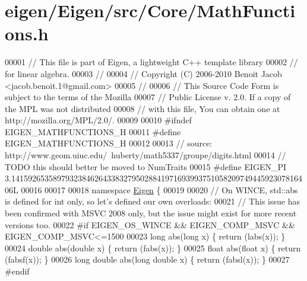 \hypertarget{eigen_2_eigen_2src_2_core_2_math_functions_8h_source}{}\section{eigen/\+Eigen/src/\+Core/\+Math\+Functions.h}
\label{eigen_2_eigen_2src_2_core_2_math_functions_8h_source}

\begin{DoxyCode}
00001 \textcolor{comment}{// This file is part of Eigen, a lightweight C++ template library}
00002 \textcolor{comment}{// for linear algebra.}
00003 \textcolor{comment}{//}
00004 \textcolor{comment}{// Copyright (C) 2006-2010 Benoit Jacob <jacob.benoit.1@gmail.com>}
00005 \textcolor{comment}{//}
00006 \textcolor{comment}{// This Source Code Form is subject to the terms of the Mozilla}
00007 \textcolor{comment}{// Public License v. 2.0. If a copy of the MPL was not distributed}
00008 \textcolor{comment}{// with this file, You can obtain one at http://mozilla.org/MPL/2.0/.}
00009 
00010 \textcolor{preprocessor}{#ifndef EIGEN\_MATHFUNCTIONS\_H}
00011 \textcolor{preprocessor}{#define EIGEN\_MATHFUNCTIONS\_H}
00012 
00013 \textcolor{comment}{// source: http://www.geom.uiuc.edu/~huberty/math5337/groupe/digits.html}
00014 \textcolor{comment}{// TODO this should better be moved to NumTraits}
00015 \textcolor{preprocessor}{#define EIGEN\_PI 3.141592653589793238462643383279502884197169399375105820974944592307816406L}
00016 
00017 
00018 \textcolor{keyword}{namespace }\hyperlink{namespace_eigen}{Eigen} \{
00019 
00020 \textcolor{comment}{// On WINCE, std::abs is defined for int only, so let's defined our own overloads:}
00021 \textcolor{comment}{// This issue has been confirmed with MSVC 2008 only, but the issue might exist for more recent versions
       too.}
00022 \textcolor{preprocessor}{#if EIGEN\_OS\_WINCE && EIGEN\_COMP\_MSVC && EIGEN\_COMP\_MSVC<=1500}
00023 \textcolor{keywordtype}{long}        abs(\textcolor{keywordtype}{long}        x) \{ \textcolor{keywordflow}{return} (labs(x));  \}
00024 \textcolor{keywordtype}{double}      abs(\textcolor{keywordtype}{double}      x) \{ \textcolor{keywordflow}{return} (fabs(x));  \}
00025 \textcolor{keywordtype}{float}       abs(\textcolor{keywordtype}{float}       x) \{ \textcolor{keywordflow}{return} (fabsf(x)); \}
00026 \textcolor{keywordtype}{long} \textcolor{keywordtype}{double} abs(\textcolor{keywordtype}{long} \textcolor{keywordtype}{double} x) \{ \textcolor{keywordflow}{return} (fabsl(x)); \}
00027 \textcolor{preprocessor}{#endif}

\end{DoxyCode}
